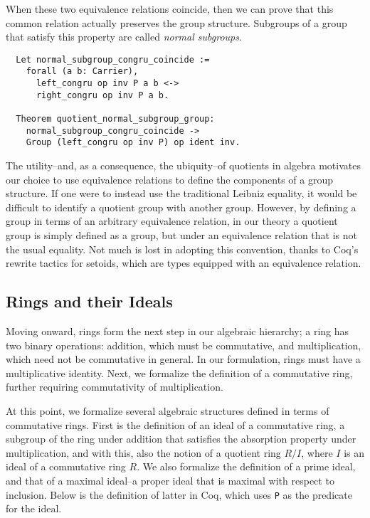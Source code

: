 \documentclass[referee,sn-mathphys]{sn-jnl}
\theoremstyle{definition}
\theoremstyle{remark}
\numberwithin{equation}{section}
\numberwithin{figure}{subsection}
\begin{document}
When these two equivalence relations coincide, then we can prove that this common
 relation actually preserves the group structure. Subgroups of a group that satisfy 
this property are called \emph{normal subgroups}.

\begin{verbatim}
  Let normal_subgroup_congru_coincide :=
    forall (a b: Carrier),
      left_congru op inv P a b <->
      right_congru op inv P a b.

  Theorem quotient_normal_subgroup_group:
    normal_subgroup_congru_coincide ->
    Group (left_congru op inv P) op ident inv.
\end{verbatim}

The utility--and, as a consequence, the ubiquity--of quotients in algebra 
motivates our choice to use equivalence relations to define the components of a group structure. If one
were to instead use the traditional Leibniz equality, it would be difficult to
identify a quotient group with another group. However, by  defining a group in
terms of an arbitrary equivalence relation, in our theory a quotient group is 
simply defined as a group, but under an equivalence relation that is not the
usual equality. Not much is lost in adopting this convention, thanks to Coq's 
rewrite tactics for setoids, which are types equipped with an equivalence relation. 

\subsection{Rings and their Ideals}
Moving onward, rings form the next step in our algebraic hierarchy; a ring has
two binary operations: addition, which must be commutative, and multiplication,
which need not be commutative in general. In our formulation, rings must have a
multiplicative identity. Next, we formalize the definition of a commutative
ring, further requiring commutativity of multiplication.  

At this point, we formalize several algebraic structures defined in terms of commutative rings.
First is the definition of an ideal of a commutative ring, a subgroup of the ring
under addition that satisfies the absorption property under multiplication, and with this, also the 
notion of a quotient ring $R/I$, where $I$ is an ideal of a commutative ring
$R$.
We also formalize the definition of a  prime ideal, and that of a maximal ideal--a proper ideal that is maximal with respect to inclusion.
 Below is the definition of latter in Coq,
which uses \texttt{P} as the predicate for the ideal.
\end{document}
